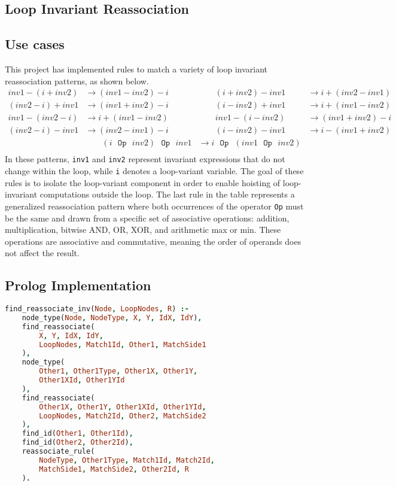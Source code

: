 \subsection{Loop Invariant Reassociation}
\subsection*{Use cases}
This project has implemented rules to match a variety of loop invariant reassociation patterns, as shown below.
\begin{align*}
    inv1 - (i + inv2)          &\rightarrow (inv1 - inv2) - i        &\qquad (i + inv2) - inv1           &\rightarrow i + (inv2 - inv1) \\
    (inv2 - i) + inv1          &\rightarrow (inv1 + inv2) - i        &\qquad (i - inv2) + inv1           &\rightarrow i + (inv1 - inv2) \\
    inv1 - (inv2 - i)          &\rightarrow i + (inv1 - inv2)        &\qquad inv1 - (i - inv2)           &\rightarrow (inv1 + inv2) - i \\
    (inv2 - i) - inv1          &\rightarrow (inv2 - inv1) - i        &\qquad (i - inv2) - inv1           &\rightarrow i - (inv1 + inv2) \\
    &\qquad  (i  \texttt{{\ }Op{\ }} inv2) \texttt{{\ }Op{\ }} inv1         &\rightarrow i \texttt{{\ }Op{\ }} (inv1 \texttt{{\ }Op{\ }} inv2) \\
\end{align*}
In these patterns, \texttt{inv1} and \texttt{inv2} represent invariant expressions that do not change within the loop, while \texttt{i} denotes a loop-variant variable. The goal of these rules is to isolate the loop-variant component in order to enable hoisting of loop-invariant computations outside the loop.
The last rule in the table represents a generalized reassociation pattern where both occurrences of the operator \texttt{Op} must be the same and drawn from a specific set of associative operations: addition, multiplication, bitwise AND, OR, XOR, and arithmetic max or min. 
These operations are associative and commutative, meaning the order of operands does not affect the result.

\subsection*{Prolog Implementation}
\begin{lstlisting}[language=Prolog]
% Entry point for invariant reassociation   
find_reassociate_inv(Node, LoopNodes, R) :-
    node_type(Node, NodeType, X, Y, IdX, IdY),
    find_reassociate(
        X, Y, IdX, IdY, 
        LoopNodes, Match1Id, Other1, MatchSide1
    ),
    node_type(
        Other1, Other1Type, Other1X, Other1Y, 
        Other1XId, Other1YId
    ),
    find_reassociate(
        Other1X, Other1Y, Other1XId, Other1YId, 
        LoopNodes, Match2Id, Other2, MatchSide2
    ),
    find_id(Other1, Other1Id),
    find_id(Other2, Other2Id),
    reassociate_rule(
        NodeType, Other1Type, Match1Id, Match2Id, 
        MatchSide1, MatchSide2, Other2Id, R
    ).
\end{lstlisting}

